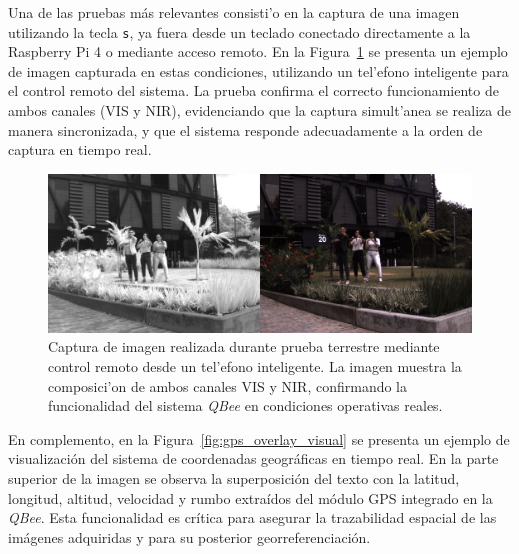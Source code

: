         \noindent Una de las pruebas más relevantes consisti'o en la captura de una imagen utilizando la tecla \texttt{s}, ya fuera desde un teclado conectado directamente a la Raspberry Pi 4 o mediante acceso remoto. En la Figura~\ref{fig:captura_prueba_remota} se presenta un ejemplo de imagen capturada en estas condiciones, utilizando un tel'efono inteligente para el control remoto del sistema. La prueba confirma el correcto funcionamiento de ambos canales (VIS y NIR), evidenciando que la captura simult'anea se realiza de manera sincronizada, y que el sistema responde adecuadamente a la orden de captura en tiempo real.
        
        \begin{figure}[h]
        \centering
        \includegraphics[width=1\textwidth]{Figures/C4/captured_image_20240201_174102.jpg}
        \caption{Captura de imagen realizada durante prueba terrestre mediante control remoto desde un tel'efono inteligente. La imagen muestra la composici'on de ambos canales VIS y NIR, confirmando la funcionalidad del sistema \textit{QBee} en condiciones operativas reales.}
        \label{fig:captura_prueba_remota}
        \end{figure}
        
        \noindent En complemento, en la Figura~\ref{fig:gps_overlay_visual} se presenta un ejemplo de visualización del sistema de coordenadas geográficas en tiempo real. En la parte superior de la imagen se observa la superposición del texto con la latitud, longitud, altitud, velocidad y rumbo extraídos del módulo GPS integrado en la \textit{QBee}. Esta funcionalidad es crítica para asegurar la trazabilidad espacial de las imágenes adquiridas y para su posterior georreferenciación.

